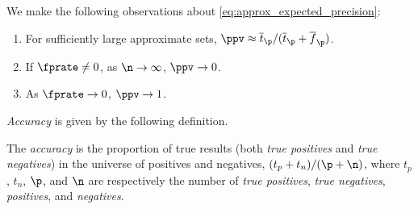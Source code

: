 \documentclass[ ../main.tex]{subfiles}
\begin{document}
We make the following observations about \cref{eq:approx_expected_precision}:
\begin{enumerate}
	\item For sufficiently large approximate sets, $\ppv \approx 
	\overline{t}_\p / (\overline{t}_\p + \overline{f}_\p)$.
	\item If $\fprate \neq 0$, as $\n \to \infty$, $\ppv \to 0$.
	\item As $\fprate \to 0$, $\ppv \to 1$.
\end{enumerate}

\emph{Accuracy} is given by the following definition.
\begin{definition}
	The \emph{accuracy} is the proportion of true results (both \emph{true 
		positives} and \emph{true negatives}) in the universe of positives and 
	negatives, $(t_p + t_n)/(\p + \n)$, where $t_p$, $t_n$, $\p$, and $\n$ are 
	respectively the number of \emph{true positives}, \emph{true negatives}, 
	\emph{positives}, and \emph{negatives}.
\end{definition}
\end{document}
